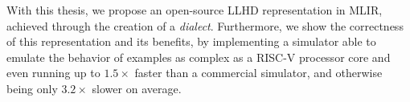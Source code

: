 With this thesis, we propose an open-source LLHD representation in MLIR, achieved through the creation of a \textit{dialect}. Furthermore, we show the correctness of this representation and its benefits, by implementing a simulator able to emulate the behavior of examples as complex as a RISC-V processor core and even running up to $1.5\times$ faster than a commercial simulator, and otherwise being only $3.2\times$ slower on average.




